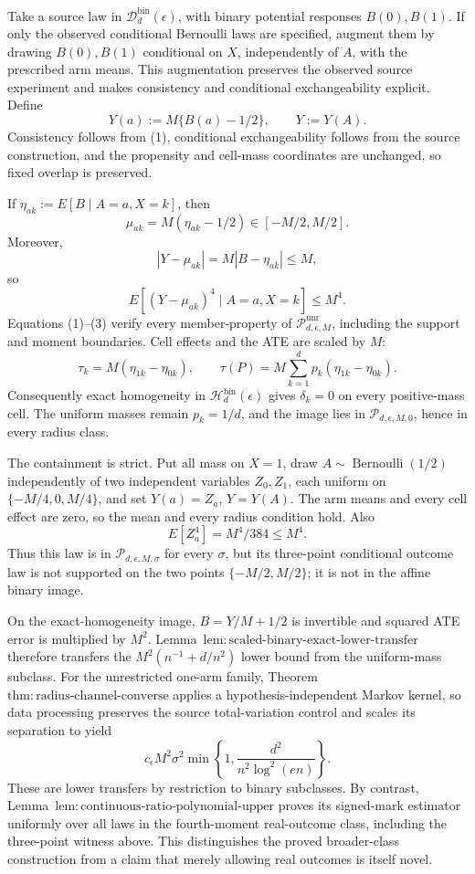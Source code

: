 Take a source law in \(\mathcal D_d^{\mathrm{bin}}(\epsilon)\), with binary potential responses \(B(0),B(1)\).  If only the observed conditional Bernoulli laws are specified, augment them by drawing \(B(0),B(1)\) conditional on \(X\), independently of \(A\), with the prescribed arm means.  This augmentation preserves the observed source experiment and makes consistency and conditional exchangeability explicit.  Define
\[
 Y(a):=M\{B(a)-1/2\},\qquad Y:=Y(A).
\tag{1}
\]
Consistency follows from (1), conditional exchangeability follows from the source construction, and the propensity and cell-mass coordinates are unchanged, so fixed overlap is preserved.

If \(\eta_{ak}:=E[B\mid A=a,X=k]\), then
\[
 \mu_{ak}=M(\eta_{ak}-1/2)\in[-M/2,M/2].
\tag{2}
\]
Moreover,
\[
 |Y-\mu_{ak}|=M|B-\eta_{ak}|\le M,
\]
so
\[
 E[(Y-\mu_{ak})^4\mid A=a,X=k]\le M^4.
\tag{3}
\]
Equations (1)--(3) verify every member-property of \(\mathcal P_{d,\epsilon,M}^{\mathrm{unr}}\), including the support and moment boundaries.  Cell effects and the ATE are scaled by \(M\):
\[
 \tau_k=M(\eta_{1k}-\eta_{0k}),
 \qquad
 \tau(P)=M\sum_{k=1}^dp_k(\eta_{1k}-\eta_{0k}).
\tag{4}
\]
Consequently exact homogeneity in \(\mathcal H_d^{\mathrm{bin}}(\epsilon)\) gives \(\delta_k=0\) on every positive-mass cell.  The uniform masses remain \(p_k=1/d\), and the image lies in \(\mathcal P_{d,\epsilon,M,0}\), hence in every radius class.

The containment is strict.  Put all mass on \(X=1\), draw \(A\sim\operatorname{Bernoulli}(1/2)\) independently of two independent variables \(Z_0,Z_1\), each uniform on \(\{-M/4,0,M/4\}\), and set \(Y(a)=Z_a\), \(Y=Y(A)\).  The arm means and every cell effect are zero, so the mean and every radius condition hold.  Also
\[
 E[Z_a^4]=M^4/384\le M^4.
\tag{5}
\]
Thus this law is in \(\mathcal P_{d,\epsilon,M,\sigma}\) for every \(\sigma\), but its three-point conditional outcome law is not supported on the two points \(\{-M/2,M/2\}\); it is not in the affine binary image.

On the exact-homogeneity image, \(B=Y/M+1/2\) is invertible and squared ATE error is multiplied by \(M^2\).  Lemma~\(\mathrm{lem:scaled\text{-}binary\text{-}exact\text{-}lower\text{-}transfer}\) therefore transfers the \(M^2(n^{-1}+d/n^2)\) lower bound from the uniform-mass subclass.  For the unrestricted one-arm family, Theorem~\(\mathrm{thm:radius\text{-}channel\text{-}converse}\) applies a hypothesis-independent Markov kernel, so data processing preserves the source total-variation control and scales its separation to yield
\[
 c_{\epsilon}M^2\sigma^2
 \min\left\{1,\frac{d^2}{n^2\log^2(en)}\right\}.
\tag{6}
\]
These are lower transfers by restriction to binary subclasses.  By contrast, Lemma~\(\mathrm{lem:continuous\text{-}ratio\text{-}polynomial\text{-}upper}\) proves its signed-mark estimator uniformly over all laws in the fourth-moment real-outcome class, including the three-point witness above.  This distinguishes the proved broader-class construction from a claim that merely allowing real outcomes is itself novel.